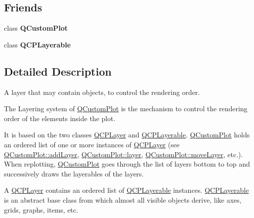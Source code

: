 \subsection*{Friends}
\begin{DoxyCompactItemize}
\item 
class {\bfseries Q\+Custom\+Plot}\hypertarget{class_q_c_p_layer_a1cdf9df76adcfae45261690aa0ca2198}{}\label{class_q_c_p_layer_a1cdf9df76adcfae45261690aa0ca2198}

\item 
class {\bfseries Q\+C\+P\+Layerable}\hypertarget{class_q_c_p_layer_ad655f55cccf49ba14d5172ec517e07ae}{}\label{class_q_c_p_layer_ad655f55cccf49ba14d5172ec517e07ae}

\end{DoxyCompactItemize}


\subsection{Detailed Description}
A layer that may contain objects, to control the rendering order. 

The Layering system of \hyperlink{class_q_custom_plot}{Q\+Custom\+Plot} is the mechanism to control the rendering order of the elements inside the plot.

It is based on the two classes \hyperlink{class_q_c_p_layer}{Q\+C\+P\+Layer} and \hyperlink{class_q_c_p_layerable}{Q\+C\+P\+Layerable}. \hyperlink{class_q_custom_plot}{Q\+Custom\+Plot} holds an ordered list of one or more instances of \hyperlink{class_q_c_p_layer}{Q\+C\+P\+Layer} (see \hyperlink{class_q_custom_plot_ad5255393df078448bb6ac83fa5db5f52}{Q\+Custom\+Plot\+::add\+Layer}, \hyperlink{class_q_custom_plot_aac492da01782820454e9136a8db28182}{Q\+Custom\+Plot\+::layer}, \hyperlink{class_q_custom_plot_ae896140beff19424e9e9e02d6e331104}{Q\+Custom\+Plot\+::move\+Layer}, etc.). When replotting, \hyperlink{class_q_custom_plot}{Q\+Custom\+Plot} goes through the list of layers bottom to top and successively draws the layerables of the layers.

A \hyperlink{class_q_c_p_layer}{Q\+C\+P\+Layer} contains an ordered list of \hyperlink{class_q_c_p_layerable}{Q\+C\+P\+Layerable} instances. \hyperlink{class_q_c_p_layerable}{Q\+C\+P\+Layerable} is an abstract base class from which almost all visible objects derive, like axes, grids, graphs, items, etc.

